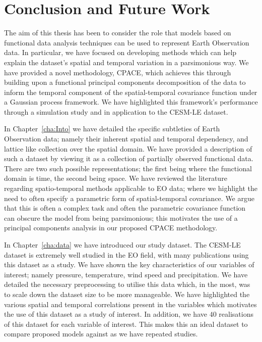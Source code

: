 
\chapter{Conclusion and Future Work\label{cha:conclusions}}  %

\ifpdf
    \graphicspath{{Chapter9/Figs/Raster/}{Chapter9/Figs/PDF/}{Chapter9/Figs/}}
\else
    \graphicspath{{Chapter9/Figs/Vector/}{Chapter9/Figs/}}
\fi
The aim of this thesis has been to consider the role that models based on functional data analysis techniques can be used to represent Earth Observation data.
In particular, we have focused on developing methods which can help explain the dataset's spatial and temporal variation in a parsimonious way.
We have provided a novel methodology, CPACE, which achieves this through building upon a functional principal components decomposition of the data to inform the temporal component of the spatial-temporal covariance function under a Gaussian process framework.
We have highlighted this framework's performance through a simulation study and in application to the CESM-LE dataset. 

In Chapter~\ref{cha:Into} we have detailed the specific subtleties of Earth Observation data; namely their inherent spatial and temporal dependency, and lattice like collection over the spatial domain.
We have provided a description of such a dataset by viewing it as a collection of partially observed functional data.
There are two such possible representations; the first being where the functional domain is time, the second being space.
We have reviewed the literature regarding spatio-temporal methods applicable to EO data; where we highlight the need to often specify a parametric form of spatial-temporal covariance.
We argue that this is often a complex task and often the parametric covariance function can obscure the model from being parsimonious; this motivates the use of a principal components analysis in our proposed CPACE methodology.

In Chapter~\ref{cha:data} we have introduced our study dataset.
The CESM-LE dataset is extremely well studied in the EO field, with many publications using this dataset as a study.
We have shown the key characteristics of our variables of interest; namely pressure, temperature, wind speed and precipitation.
We have detailed the necessary preprocessing to utilise this data which, in the most, was to scale down the dataset size to be more manageable.
We have highlighted the various spatial and temporal correlations present in the variables which motivates the use of this dataset as a study of interest.
In addition, we have $40$ realisations of this dataset for each variable of interest.
This makes this an ideal dataset to compare proposed models against as we have repeated studies.

